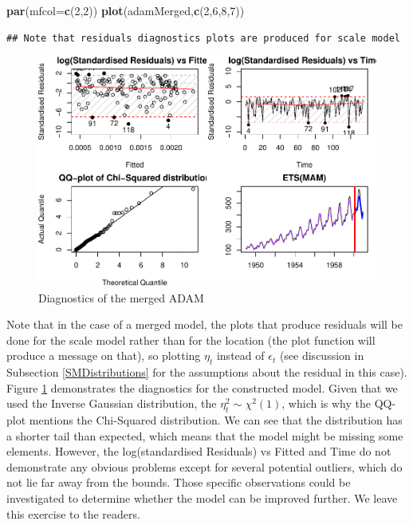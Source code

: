 \documentclass[]{book}
\newenvironment{Shaded}{\begin{snugshade}}{\end{snugshade}}
\newcommand{\DataTypeTok}[1]{\textcolor[rgb]{0.13,0.29,0.53}{#1}}
\newcommand{\DecValTok}[1]{\textcolor[rgb]{0.00,0.00,0.81}{#1}}
\newcommand{\KeywordTok}[1]{\textcolor[rgb]{0.13,0.29,0.53}{\textbf{#1}}}
\newcommand{\NormalTok}[1]{#1}
\theoremstyle{definition}
\theoremstyle{definition}
\theoremstyle{definition}
\theoremstyle{definition}
\theoremstyle{remark}
\begin{document}
\begin{Shaded}
\begin{Highlighting}[]
\KeywordTok{par}\NormalTok{(}\DataTypeTok{mfcol=}\KeywordTok{c}\NormalTok{(}\DecValTok{2}\NormalTok{,}\DecValTok{2}\NormalTok{))}
\KeywordTok{plot}\NormalTok{(adamMerged,}\KeywordTok{c}\NormalTok{(}\DecValTok{2}\NormalTok{,}\DecValTok{6}\NormalTok{,}\DecValTok{8}\NormalTok{,}\DecValTok{7}\NormalTok{))}
\end{Highlighting}
\end{Shaded}

\begin{verbatim}
## Note that residuals diagnostics plots are produced for scale model
\end{verbatim}

\begin{figure}
\centering
\includegraphics{Svetunkov--2022----ADAM_files/figure-latex/adamModelAirMergedDiagnostics-1.pdf}
\caption{\label{fig:adamModelAirMergedDiagnostics}Diagnostics of the merged ADAM}
\end{figure}

Note that in the case of a merged model, the plots that produce residuals will be done for the scale model rather than for the location (the plot function will produce a message on that), so plotting \(\eta_t\) instead of \(\epsilon_t\) (see discussion in Subsection \ref{SMDistributions} for the assumptions about the residual in this case). Figure \ref{fig:adamModelAirMergedDiagnostics} demonstrates the diagnostics for the constructed model. Given that we used the Inverse Gaussian distribution, the \(\eta_t^2 \sim \chi^2(1)\), which is why the QQ-plot mentions the Chi-Squared distribution. We can see that the distribution has a shorter tail than expected, which means that the model might be missing some elements. However, the log(standardised Residuals) vs Fitted and Time do not demonstrate any obvious problems except for several potential outliers, which do not lie far away from the bounds. Those specific observations could be investigated to determine whether the model can be improved further. We leave this exercise to the readers.
\end{document}
